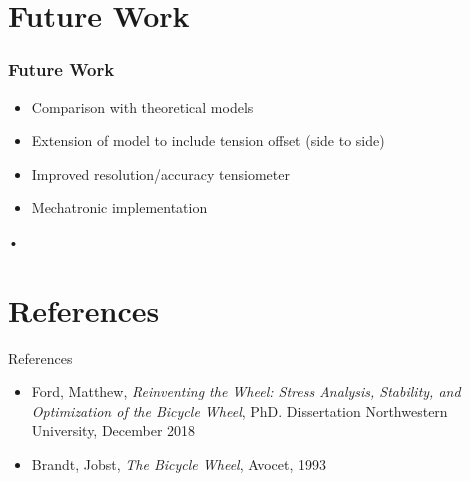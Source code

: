 \documentclass[mathserif]{beamer}
\begin{document}
\section{Future Work}

\begin{frame}
\frametitle{Future Work}
\begin{itemize}
\item Comparison with theoretical models 
\item Extension of model to include tension offset (side to side)
\item Improved resolution/accuracy tensiometer
\item Mechatronic implementation 
\end{itemize}•
\end{frame}
      
\section{References}

\begin{frame}{References}
\begin{itemize}
    \item Ford, Matthew, \emph{Reinventing the Wheel: Stress Analysis, Stability, and Optimization of the Bicycle Wheel}, PhD. Dissertation Northwestern University, December 2018
    \item Brandt, Jobst, \emph{The Bicycle Wheel}, Avocet, 1993
\end{itemize}
\end{frame}
\end{document}
